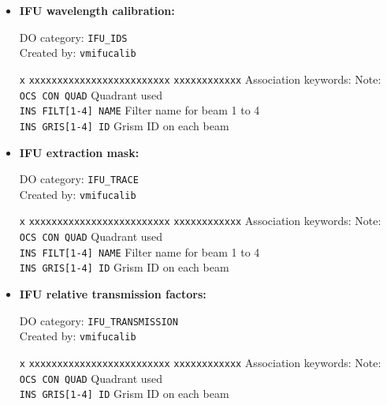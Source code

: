 \begin{itemize}
\item {\bf IFU wavelength calibration:}

DO category: {\tt IFU\_IDS} \\
Created by: {\tt vmifucalib} \\

\begin{tabbing}
{\tt x} \= {\tt xxxxxxxxxxxxxxxxxxxxxxxxx} \= {\tt xxxxxxxxxxxx} \kill
\> Association keywords: \> Note: \\
\> {\tt OCS CON QUAD} \> Quadrant used \\
\> {\tt INS FILT[1-4] NAME} \> Filter name for beam 1 to 4 \\
\> {\tt INS GRIS[1-4] ID} \> Grism ID on each beam \\
\end{tabbing}

\item {\bf IFU extraction mask:}

DO category: {\tt IFU\_TRACE} \\
Created by: {\tt vmifucalib} \\

\begin{tabbing}
{\tt x} \= {\tt xxxxxxxxxxxxxxxxxxxxxxxxx} \= {\tt xxxxxxxxxxxx} \kill
\> Association keywords: \> Note: \\
\> {\tt OCS CON QUAD} \> Quadrant used \\
\> {\tt INS FILT[1-4] NAME} \> Filter name for beam 1 to 4 \\
\> {\tt INS GRIS[1-4] ID} \> Grism ID on each beam \\
\end{tabbing}

\item {\bf IFU relative transmission factors:}

DO category: {\tt IFU\_TRANSMISSION} \\
Created by: {\tt vmifucalib} \\

\begin{tabbing}
{\tt x} \= {\tt xxxxxxxxxxxxxxxxxxxxxxxxx} \= {\tt xxxxxxxxxxxx} \kill
\> Association keywords: \> Note: \\
\> {\tt OCS CON QUAD} \> Quadrant used \\
\> {\tt INS GRIS[1-4] ID} \> Grism ID on each beam \\
\end{tabbing}

\end{itemize}

